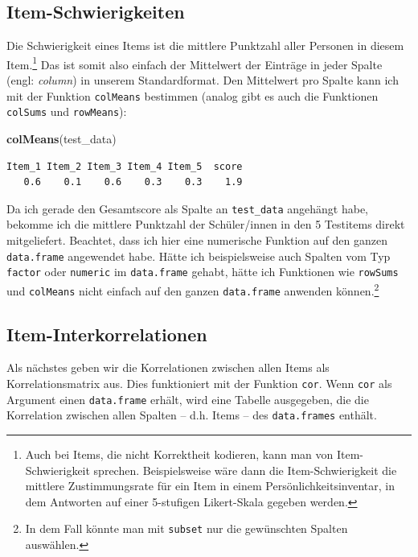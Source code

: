 \documentclass[12pt,]{tufte-book}
\newenvironment{Shaded}{\begin{snugshade}}{\end{snugshade}}
\newcommand{\KeywordTok}[1]{\textcolor[rgb]{0.13,0.29,0.53}{\textbf{#1}}}
\newcommand{\NormalTok}[1]{#1}
\theoremstyle{definition}
\theoremstyle{definition}
\theoremstyle{definition}
\theoremstyle{remark}
\begin{document}
\subsection{Item-Schwierigkeiten}\label{item-schwierigkeiten}

Die Schwierigkeit eines Items ist die mittlere Punktzahl aller Personen
in diesem Item.\footnote{Auch bei Items, die nicht Korrektheit kodieren,
  kann man von Item-Schwierigkeit sprechen. Beispielsweise wäre dann die
  Item-Schwierigkeit die mittlere Zustimmungsrate für ein Item in einem
  Persönlichkeitsinventar, in dem Antworten auf einer 5-stufigen
  Likert-Skala gegeben werden.} Das ist somit also einfach der
Mittelwert der Einträge in jeder Spalte (engl: \emph{column}) in unserem
Standardformat. Den Mittelwert pro Spalte kann ich mit der Funktion
\texttt{colMeans} bestimmen (analog gibt es auch die Funktionen
\texttt{colSums} und \texttt{rowMeans}):

\begin{Shaded}
\begin{Highlighting}[]
\KeywordTok{colMeans}\NormalTok{(test_data)}
\end{Highlighting}
\end{Shaded}

\begin{verbatim}
Item_1 Item_2 Item_3 Item_4 Item_5  score 
   0.6    0.1    0.6    0.3    0.3    1.9 
\end{verbatim}

Da ich gerade den Gesamtscore als Spalte an \texttt{test\_data}
angehängt habe, bekomme ich die mittlere Punktzahl der Schüler/innen in
den 5 Testitems direkt mitgeliefert. Beachtet, dass ich hier eine
numerische Funktion auf den ganzen \texttt{data.frame} angewendet habe.
Hätte ich beispielsweise auch Spalten vom Typ \texttt{factor} oder
\texttt{numeric} im \texttt{data.frame} gehabt, hätte ich Funktionen wie
\texttt{rowSums} und \texttt{colMeans} nicht einfach auf den ganzen
\texttt{data.frame} anwenden können.\footnote{In dem Fall könnte man mit
  \texttt{subset} nur die gewünschten Spalten auswählen.}

\subsection{Item-Interkorrelationen}\label{item-interkorrelationen}

Als nächstes geben wir die Korrelationen zwischen allen Items als
Korrelationsmatrix aus. Dies funktioniert mit der Funktion \texttt{cor}.
Wenn \texttt{cor} als Argument einen \texttt{data.frame} erhält, wird
eine Tabelle ausgegeben, die die Korrelation zwischen allen Spalten --
d.h. Items -- des \texttt{data.frames} enthält.
\end{document}
